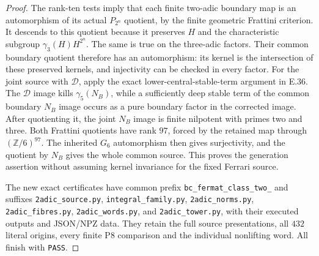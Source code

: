 \begin{proof}
The rank-ten tests imply that each finite
two-adic boundary map is an automorphism
of its actual $P_{2^n}$ quotient, by the
finite geometric Frattini criterion.
It descends to this quotient because it
preserves $H$ and the characteristic
subgroup $\gamma_3(H)H^{2^n}$.
The same is true on the three-adic factors.
Their common boundary quotient therefore
has an automorphism: its kernel is the
intersection of these preserved kernels,
and injectivity can be checked in every
factor.
For the joint source with $\mathscr D$,
apply the exact lower-central-stable-term
argument in E.36.  The $\mathscr D$ image
kills $\gamma_5(N_B)$, while a sufficiently
deep stable term of the common boundary
$N_B$ image occurs as a pure boundary
factor in the corrected image.
After quotienting it, the joint $N_B$
image is finite nilpotent with primes
two and three.  Both Frattini quotients
have rank $97$, forced by the retained
map through $(\mathbb Z/6)^{97}$.
The inherited $G_6$ automorphism then
gives surjectivity, and the quotient by
$N_B$ gives the whole common source.
This proves the generation assertion
without assuming kernel invariance for
the fixed Ferrari source.

The new exact certificates have common prefix
\texttt{bc\_fermat\_class\_two\_} and suffixes
\texttt{2adic\_source.py}, \texttt{integral\_family.py},
\texttt{2adic\_norms.py}, \texttt{2adic\_fibres.py},
\texttt{2adic\_words.py}, and \texttt{2adic\_tower.py},
with their executed outputs and JSON/NPZ
data.  They retain the full source
presentations, all $432$ literal origins,
every finite P8 comparison and the
individual nonlifting word.  All finish
with \texttt{PASS}.
\end{proof}
